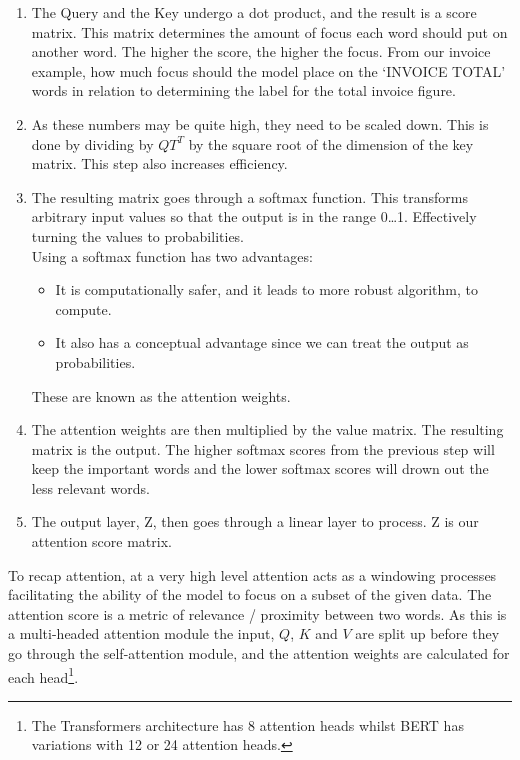 \begin{enumerate}
	\item The Query and the Key undergo a dot product, and the result is a score matrix. This matrix determines the amount of focus each word should put on
	      another word. The higher the score, the higher the focus.
	      \bigbreak
	      From our invoice example, how much focus should the model place on the `INVOICE TOTAL' words in relation to determining the label for
	      the total invoice figure.
	\item As these numbers may be quite high, they need to be scaled down. This is done by dividing by $QT^{T}$ by the square
	      root of the dimension of the key matrix. This step also increases efficiency.
	\item The resulting matrix goes through a softmax function. This transforms arbitrary input values
	      so that the output is in the range 0\ldots1. Effectively turning the values to probabilities.\\
	      Using a softmax function has two advantages:
	      \begin{itemize}
		      \item It is computationally safer, and it leads to more robust algorithm, to compute.
		      \item It also has a conceptual advantage since we can treat the output as probabilities.
	      \end{itemize}
	      These are known as the attention weights.
	\item The attention weights are then multiplied by the value matrix. The resulting matrix is the output. The higher
	      softmax scores from the previous step will keep the important words and the lower softmax scores will drown out the
	      less relevant words.
	\item The output layer, Z, then goes through a linear layer to process. Z is our attention score matrix.
\end{enumerate}
To recap attention, at a very high level attention acts as a windowing processes facilitating the ability of the model to focus on
a subset of the given data. The attention score is a metric of relevance / proximity between two words.
\bigbreak
As this is a multi-headed attention module the input, $Q$, $K$ and $V$ are split up before they go through the self-attention module,
and the attention weights are calculated for each head\footnote{The Transformers architecture has 8 attention heads whilst
	BERT has variations with 12 or 24 attention heads.}.
